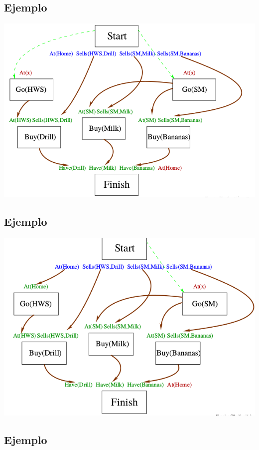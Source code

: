 \documentclass[11pt]{article}
\begin{document}
\subsection*{Ejemplo}
\label{sec:org40842fc}

\begin{center}
\includegraphics[width=.9\linewidth]{imagenes/pop11.png}
\end{center}

\subsection*{Ejemplo}
\label{sec:orgab0f0ee}

\begin{center}
\includegraphics[width=.9\linewidth]{imagenes/pop12.png}
\end{center}

\subsection*{Ejemplo}
\label{sec:org441b86a}
\end{document}
